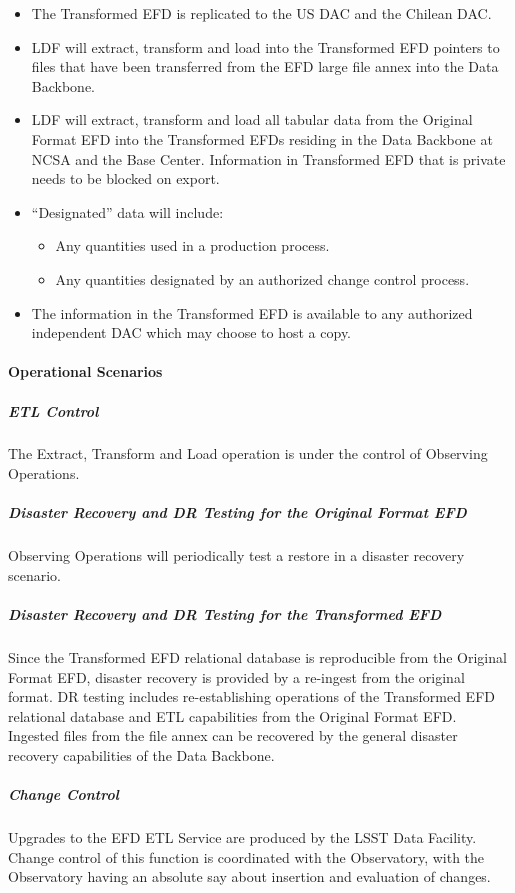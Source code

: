 \begin{itemize}
\item The Transformed EFD is replicated to the US DAC and the Chilean DAC.
\item LDF will extract, transform and load into the Transformed EFD pointers to files
that have been transferred from the EFD large file annex into the Data Backbone.
\item LDF will extract, transform and load all tabular data from the
Original Format EFD into the Transformed EFDs residing in the Data Backbone at
NCSA and the Base Center. Information in Transformed EFD that is private needs to be blocked on export.
\item “Designated” data will include:
  \begin{itemize}
  \item Any quantities used in a production process.
  \item Any quantities designated by an authorized change control process.
  \end{itemize}
\item The information in the Transformed EFD is available to any authorized independent
DAC which may choose to host a copy.
\end{itemize}

\paragraph{Operational Scenarios}

\subparagraph{ETL Control}

The Extract, Transform and Load operation is under the control of Observing Operations.

\subparagraph{Disaster Recovery and DR Testing for the Original Format EFD}

Observing Operations will periodically test a restore in a disaster recovery scenario.

\subparagraph{Disaster Recovery and DR Testing for the Transformed EFD}

Since the Transformed EFD relational database is reproducible from the
Original Format EFD, disaster recovery is provided by a re-ingest from the
original format. DR testing includes re-establishing operations of the Transformed
EFD relational database and ETL capabilities from the Original Format EFD. Ingested
files from the file annex can be recovered by the general disaster recovery capabilities
of the Data Backbone.

\subparagraph{Change Control}

Upgrades to the EFD ETL Service are produced by the LSST Data Facility.
Change control of this function is coordinated with the Observatory, with the
Observatory having an absolute say about insertion and evaluation of changes.
